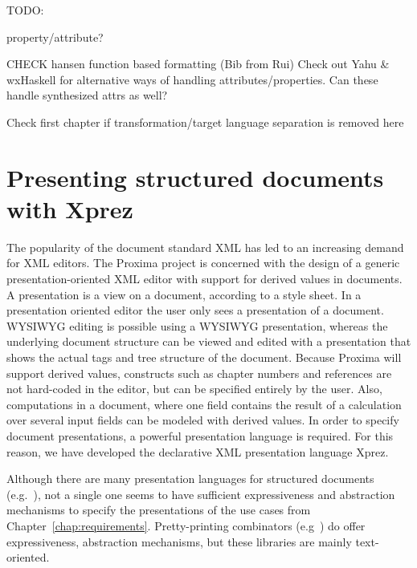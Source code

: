 
\bc
TODO:


property/attribute?

CHECK hansen function based formatting (Bib from Rui)
Check out  Yahu & wxHaskell for alternative ways of handling attributes/properties. Can these handle synthesized attrs as well?


Check first chapter if transformation/target language separation is removed here
\ec






\chapter{Presenting structured documents with {\sc Xprez}} \label{chap:presenting}



\bc
The popularity of the document standard XML has led to an increasing demand for XML editors. The Proxima project is concerned with the design of a generic presentation-oriented XML editor with support for derived values in documents. A presentation is a view on a document, according to a style sheet. In a presentation oriented editor the user only sees a presentation of a document. WYSIWYG editing is possible using a WYSIWYG presentation, whereas the underlying document structure can be viewed and edited with a presentation that shows the actual tags and tree structure of the document. Because Proxima will support derived values, constructs such as chapter numbers and references are not hard-coded in the editor, but can be specified entirely by the user. Also, computations in a document, where one field contains the result of a calculation over several input fields can be modeled with derived values. In order to specify document presentations, a powerful presentation language is required. For this reason, we have developed the declarative XML presentation language {\sc Xprez}.
\ec


Although there are many presentation languages for structured documents (e.g.~\cite{css2, badros99ccss, marden98psl, xsl10, quint97thot}), not a single one seems to have sufficient expressiveness and abstraction mechanisms to specify the presentations of the use cases from Chapter~\ref{chap:requirements}. Pretty-printing combinators (e.g~\cite{oppen80prettyPrinting, swierstra98combinators, hughes1995prettyPrinting, kahl99galleyCombs, brand96generationOfFormatters}) do offer expressiveness, abstraction mechanisms, but these libraries are mainly text-oriented.

